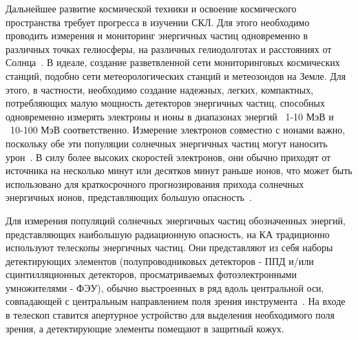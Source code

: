 Дальнейшее развитие космической техники и освоение космического пространства
требует прогресса в изучении СКЛ. Для этого необходимо проводить измерения и
мониторинг энергичных частиц одновременно в различных точках гелиосферы, на
различных гелиодолготах и расстояниях от Солнца~\cite{schrijver2015understanding}. В идеале, создание разветвленной сети мониторинговых космических станций, подобно сети метеорологических станций и метеозондов на Земле. Для этого, в частности, необходимо создание надежных, легких, компактных, потребляющих малую мощность детекторов энергичных частиц, способных одновременно измерять электроны и ионы в диапазонах энергий ~1-10 МэВ и ~10-100 МэВ соответственно. Измерение электронов совместно с ионами важно, поскольку обе эти популяции солнечных энергичных частиц могут наносить урон~\cite{petrukovich2008}. В силу более высоких скоростей электронов, они обычно приходят от источника на несколько минут или десятков минут раньше ионов, что может быть использовано для краткосрочного прогнозирования прихода солнечных энергичных ионов, представляющих большую опасность~\cite{posner2007up}.

Для измерения популяций солнечных энергичных частиц обозначенных энергий,
представляющих наибольшую радиационную опасность, на КА традиционно используют
телескопы энергичных частиц. Они представляют из себя наборы детектирующих
элементов (полупроводниковых детекторов - ППД и/или сцинтилляционных детекторов, просматриваемых фотоэлектронными умножителями - ФЭУ), обычно выстроенных в ряд вдоль центральной оси, совпадающей с центральным направлением поля зрения инструмента~\cite{wuest2007calibration,galperin1972}. На входе в телескоп ставится апертурное устройство для выделения необходимого поля зрения, а детектирующие элементы помещают в защитный кожух.


